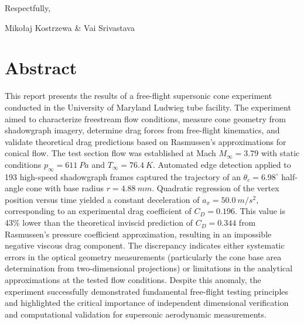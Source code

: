 Respectfully,

Mikołaj Kostrzewa \& Vai Srivastava


\pagebreak

\thispagestyle{empty}
\hypertarget{tableofcontents}{\tableofcontents}

\renewcommand{\listfigurename}{Figures}
\listoffigures

\renewcommand{\listtablename}{Tables}
\listoftables

\renewcommand{\listlistingname}{Listings}
\listoflistings

\newpage
{}


\section{Abstract} \label{sec:abstract}

This report presents the results of a free-flight supersonic cone experiment conducted in the University of Maryland Ludwieg tube facility. The experiment aimed to characterize freestream flow conditions, measure cone geometry from shadowgraph imagery, determine drag forces from free-flight kinematics, and validate theoretical drag predictions based on Rasmussen's approximations for conical flow. The test section flow was established at Mach $M_\infty = 3.79$ with static conditions $p_\infty = \qty{611}{Pa}$ and $T_\infty = \qty{76.4}{K}$. Automated edge detection applied to 193 high-speed shadowgraph frames captured the trajectory of an $\theta_c = 6.98^\circ$ half-angle cone with base radius $r = \qty{4.88}{mm}$. Quadratic regression of the vertex position versus time yielded a constant deceleration of $a_x = \qty{50.0}{m/s^2}$, corresponding to an experimental drag coefficient of $C_D = 0.196$. This value is 43\% lower than the theoretical inviscid prediction of $C_D = 0.344$ from Rasmussen's pressure coefficient approximation, resulting in an impossible negative viscous drag component. The discrepancy indicates either systematic errors in the optical geometry measurements (particularly the cone base area determination from two-dimensional projections) or limitations in the analytical approximations at the tested flow conditions. Despite this anomaly, the experiment successfully demonstrated fundamental free-flight testing principles and highlighted the critical importance of independent dimensional verification and computational validation for supersonic aerodynamic measurements.


